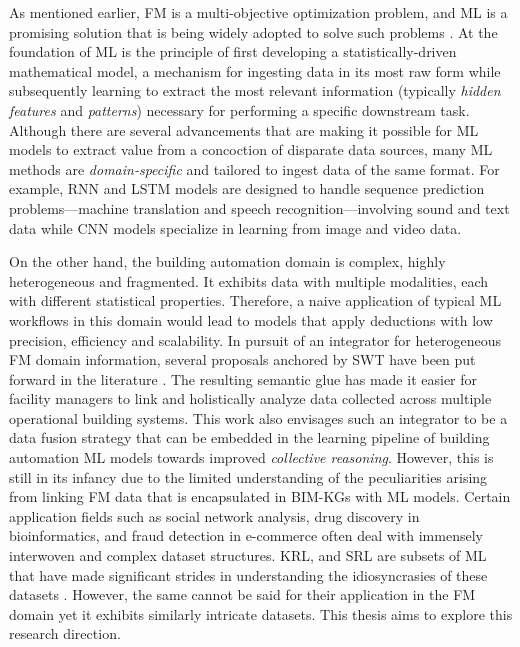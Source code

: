 As mentioned earlier, \ac{FM} is a multi-objective optimization problem, and \ac{ML} is a promising solution that is being widely adopted to solve such problems \citep{Toffolo2002, Asadi2012Multi-objectiveApplication, Shaikh2018, Chen2018b, Merlet2022IntegrationRetrofit, Wijeratne2022Multi-objectivePhase}. At the foundation of ML is the principle of first developing a statistically-driven mathematical model, a mechanism for ingesting data in its most raw form while subsequently learning to extract the most relevant information (typically \textit{hidden} \textit{features} and  \textit{patterns}) necessary for performing a specific downstream task. Although there are several advancements that are making it possible for \ac{ML} models to extract value from a concoction of disparate data sources, many \ac{ML} methods are \textit{domain-specific} and tailored to ingest data of the same format. For example, \ac{RNN} and \ac{LSTM} models \citep{Hochreiter1997LongMemory} are designed to handle sequence prediction problems---machine translation and speech recognition---involving sound and text data while \ac{CNN} models \citep{LeCun1998Gradient-basedRecognition} specialize in learning from image and video data.     

On the other hand, the building automation domain is complex, highly heterogeneous and fragmented. It exhibits data with multiple modalities, each with different statistical properties. Therefore, a naive application of typical \ac{ML} workflows in this domain would lead to models that apply deductions with low precision, efficiency and scalability. In pursuit of an integrator for heterogeneous \ac{FM} domain information, several proposals anchored by \ac{SWT} have been put forward in the literature \citep{Pauwels, Pauwels2016, Pauwels2017a, Rasmussen2019a, Pauwels2022KnowledgeEnvironment}. The resulting semantic glue has made it easier for facility managers to link and holistically analyze data collected across multiple operational building systems. This work also envisages such an integrator to be a data fusion strategy that can be embedded in the learning pipeline of building automation \ac{ML} models towards improved \textit{collective reasoning}. However, this is still in its infancy due to the limited understanding of the peculiarities arising from linking \ac{FM} data that is encapsulated in \acp{BIM-KG} with \ac{ML} models. Certain application fields such as social network analysis, drug discovery in bioinformatics, and fraud detection in e-commerce often deal with immensely interwoven and complex dataset structures. \ac{KRL}, and \ac{SRL} are subsets of \ac{ML} that have made significant strides in understanding the idiosyncrasies of these datasets \citep{Nickel2011, Nickel2012FactorizingYAGO, 
Bengio2013RepresentationPerspectives,Nickel2016AGraphsb, Lin2018KnowledgeReview, Yi2022GraphApplications}. However, the same cannot be said for their application in the \ac{FM} domain yet it exhibits similarly intricate datasets. This thesis aims to explore this research direction. 

